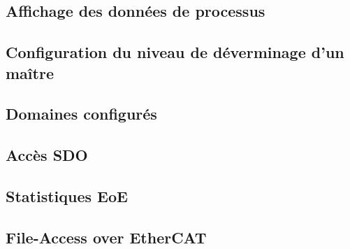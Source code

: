 \documentclass[a4paper,12pt,BCOR=6mm,bibtotoc,idxtotoc]{scrbook}
\begin{document}
\subsection{Affichage des donn\'ees de processus}




\subsection{Configuration du niveau de d\'everminage d'un ma\^itre}
\label{sec:ethercat-debug}




\subsection{Domaines configur\'es}




\subsection{Acc\`es SDO}






\subsection{Statistiques EoE}




\subsection{File-Access over EtherCAT}
\end{document}
